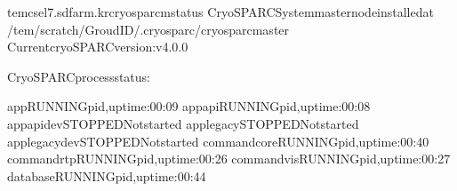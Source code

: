\documentclass[a4paper,11pt,english]{sphinxmanual}
\begin{document}
\begin{sphinxVerbatim}[commandchars=\\\{\}]
tem\PYGZhy{}cs\PYGZhy{}el7.sdfarm.kr\PYGZdl{}\PYGZgt{}cryosparcmstatus
\PYGZhy{}\PYGZhy{}\PYGZhy{}\PYGZhy{}\PYGZhy{}\PYGZhy{}\PYGZhy{}\PYGZhy{}\PYGZhy{}\PYGZhy{}\PYGZhy{}\PYGZhy{}\PYGZhy{}\PYGZhy{}\PYGZhy{}\PYGZhy{}\PYGZhy{}\PYGZhy{}\PYGZhy{}\PYGZhy{}\PYGZhy{}\PYGZhy{}\PYGZhy{}\PYGZhy{}\PYGZhy{}\PYGZhy{}\PYGZhy{}\PYGZhy{}\PYGZhy{}\PYGZhy{}\PYGZhy{}\PYGZhy{}\PYGZhy{}\PYGZhy{}\PYGZhy{}\PYGZhy{}\PYGZhy{}\PYGZhy{}\PYGZhy{}\PYGZhy{}\PYGZhy{}\PYGZhy{}\PYGZhy{}\PYGZhy{}\PYGZhy{}\PYGZhy{}\PYGZhy{}\PYGZhy{}\PYGZhy{}\PYGZhy{}\PYGZhy{}\PYGZhy{}\PYGZhy{}\PYGZhy{}\PYGZhy{}\PYGZhy{}\PYGZhy{}\PYGZhy{}\PYGZhy{}\PYGZhy{}\PYGZhy{}\PYGZhy{}\PYGZhy{}\PYGZhy{}\PYGZhy{}\PYGZhy{}\PYGZhy{}\PYGZhy{}\PYGZhy{}\PYGZhy{}\PYGZhy{}\PYGZhy{}\PYGZhy{}\PYGZhy{}\PYGZhy{}\PYGZhy{}
CryoSPARCSystemmasternodeinstalledat
/tem/scratch/\PYGZlt{}GroudID\PYGZgt{}/.cryosparc/cryosparc\PYGZus{}master
CurrentcryoSPARCversion:v4.0.0
\PYGZhy{}\PYGZhy{}\PYGZhy{}\PYGZhy{}\PYGZhy{}\PYGZhy{}\PYGZhy{}\PYGZhy{}\PYGZhy{}\PYGZhy{}\PYGZhy{}\PYGZhy{}\PYGZhy{}\PYGZhy{}\PYGZhy{}\PYGZhy{}\PYGZhy{}\PYGZhy{}\PYGZhy{}\PYGZhy{}\PYGZhy{}\PYGZhy{}\PYGZhy{}\PYGZhy{}\PYGZhy{}\PYGZhy{}\PYGZhy{}\PYGZhy{}\PYGZhy{}\PYGZhy{}\PYGZhy{}\PYGZhy{}\PYGZhy{}\PYGZhy{}\PYGZhy{}\PYGZhy{}\PYGZhy{}\PYGZhy{}\PYGZhy{}\PYGZhy{}\PYGZhy{}\PYGZhy{}\PYGZhy{}\PYGZhy{}\PYGZhy{}\PYGZhy{}\PYGZhy{}\PYGZhy{}\PYGZhy{}\PYGZhy{}\PYGZhy{}\PYGZhy{}\PYGZhy{}\PYGZhy{}\PYGZhy{}\PYGZhy{}\PYGZhy{}\PYGZhy{}\PYGZhy{}\PYGZhy{}\PYGZhy{}\PYGZhy{}\PYGZhy{}\PYGZhy{}\PYGZhy{}\PYGZhy{}\PYGZhy{}\PYGZhy{}\PYGZhy{}\PYGZhy{}\PYGZhy{}\PYGZhy{}\PYGZhy{}\PYGZhy{}\PYGZhy{}\PYGZhy{}

CryoSPARCprocessstatus:

appRUNNINGpid,uptime:00:09
app\PYGZus{}apiRUNNINGpid,uptime:00:08
app\PYGZus{}api\PYGZus{}devSTOPPEDNotstarted
app\PYGZus{}legacySTOPPEDNotstarted
app\PYGZus{}legacy\PYGZus{}devSTOPPEDNotstarted
command\PYGZus{}coreRUNNINGpid,uptime:00:40
command\PYGZus{}rtpRUNNINGpid,uptime:00:26
command\PYGZus{}visRUNNINGpid,uptime:00:27
databaseRUNNINGpid,uptime:00:44


\end{sphinxVerbatim}
\end{document}
